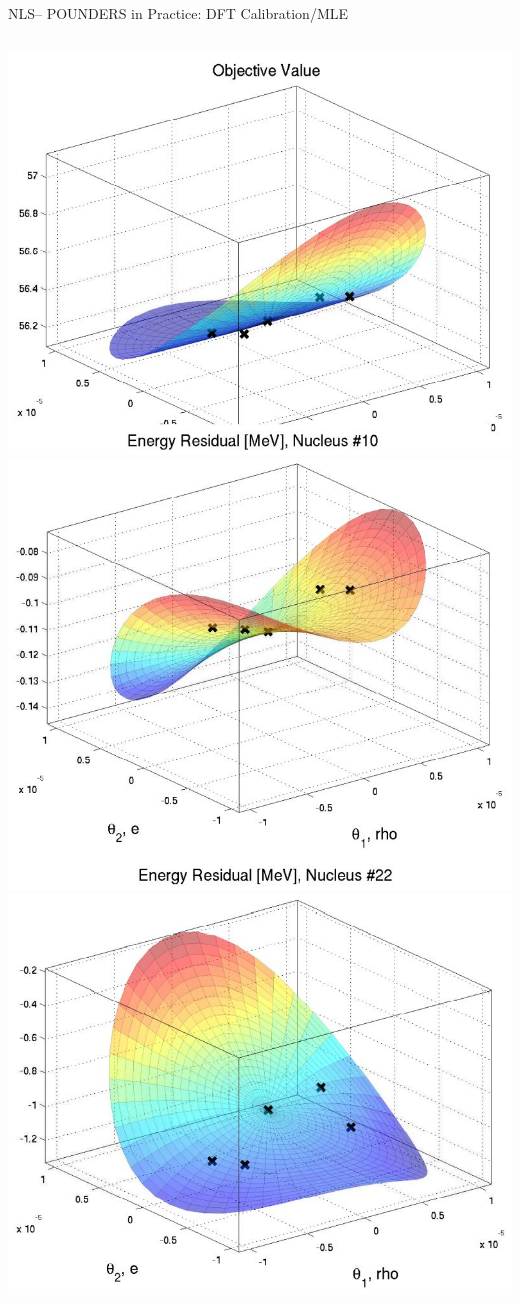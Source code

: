 \documentclass[handout,aspectratio=54]{beamer}
\numberwithin{theorem}{section}
\begin{document}
\begin{frame}{NLS– POUNDERS in Practice: DFT Calibration/MLE}
\begin{columns}
\includegraphics[width=\textwidth]{fig/47-2.jpg}
\includegraphics[width=\textwidth]{fig/47-3.jpg}
\includegraphics[width=\textwidth]{fig/47-4.jpg}

\end{columns}
\end{frame}
\end{document}

